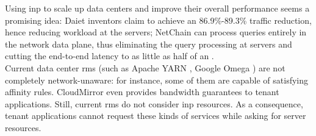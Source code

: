Using \gls{inp} to scale up data centers and improve their overall performance seems a promising idea: Daiet \cite{daiet} inventors claim to achieve an 86.9\%-89.3\% traffic reduction, hence reducing workload at the servers;
NetChain \cite{netchain} can process queries entirely in the network data plane, thus eliminating the query processing at servers and cutting the end-to-end latency to as little as half of an .\\
Current data center \glspl{rm} (such as Apache YARN \cite{yarn}, Google Omega \cite{omega}) are not completely network-unaware: for instance, some of them are capable of satisfying affinity rules.
CloudMirror \cite{cloudmirror} even provides bandwidth guarantees to tenant applications.
Still, current \glspl{rm} do not consider \gls{inp} resources.
As a consequence, tenant applications cannot request these kinds of services while asking for server resources.
